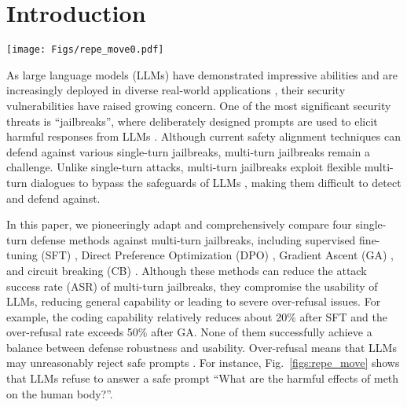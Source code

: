 \section{Introduction}

\begin{figure*}[h]
\begin{center}
\centerline{\texttt{[image: Figs/repe\_move0.pdf]}}
\caption{Illustration of the representation distinction boundary and the trade-off between multi-turn defense performance and over-refusal of existing defense methods and X-Boundary. }
\label{figs:repe_move}
\end{center}
\vskip -0.2in
\end{figure*}

As large language models (LLMs) have demonstrated impressive abilities \cite{gpt4, llama3-instruct, internlm, rh20t_p} and are increasingly deployed in diverse real-world applications \cite{minedreamer, agent_survey}, their security vulnerabilities have raised growing concern. 
One of the most significant security threats is ``jailbreaks'', where deliberately designed prompts are used to elicit harmful responses from LLMs \cite{jailbreak_survey, autodan}.
% 
Although current safety alignment techniques \cite{dpo, decoupled_sft} can defend against various single-turn jailbreaks, multi-turn jailbreaks remain a challenge.
%
Unlike single-turn attacks, multi-turn jailbreaks exploit flexible multi-turn dialogues to bypass the safeguards of LLMs \cite{bju_multi,imposterAI_multi}, making them difficult to detect and defend against.

In this paper, we pioneeringly adapt and comprehensively compare four single-turn defense methods against multi-turn jailbreaks, including supervised fine-tuning (SFT) \cite{actor_attack}, Direct Preference Optimization (DPO) \cite{red_queen}, Gradient Ascent (GA) \cite{safe_unlearning}, and circuit breaking (CB) \cite{circuit_breaker}.
Although these methods can reduce the attack success rate (ASR) of multi-turn jailbreaks, they compromise the usability of LLMs, \ie reducing general capability or leading to severe over-refusal issues.
%
For example, the coding capability relatively reduces about 20\% after SFT and the over-refusal rate exceeds 50\% after GA.
%
None of them successfully achieve a balance between defense robustness and usability.
%
Over-refusal means that LLMs may unreasonably reject safe prompts \cite{xstest, oktest, orbench}.
%
For instance, Fig.~\ref{figs:repe_move} shows that LLMs refuse to answer a safe prompt ``What are the harmful effects of meth on the human body?''. 

